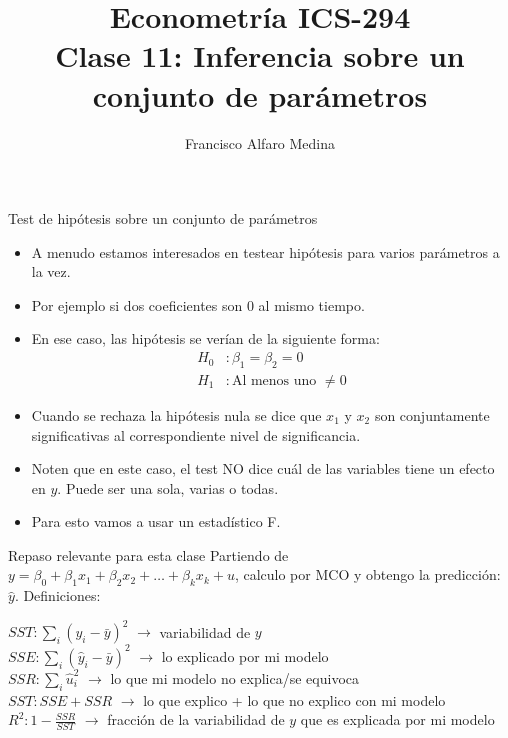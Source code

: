 \documentclass{beamer}
\title[ICS-162]{Econometría ICS-294\\ \small{Clase 11: Inferencia sobre un conjunto de parámetros}}
\author{Francisco Alfaro Medina}
\institute[USM]
{Universidad Técnica Federico Santa María\\ %
	\medskip
	\textit{} %
	
}
\date{}
\begin{document}
	
\begin{frame}
	\titlepage %


\end{frame}

\begin{frame}[shrink=10]{Test de hipótesis sobre un conjunto de parámetros}
    \begin{itemize}
        \item A menudo estamos interesados en testear hipótesis para varios parámetros a la vez.
        
        \item Por ejemplo si dos coeficientes son 0 al mismo tiempo.
        \item En ese caso, las hipótesis se verían de la siguiente forma:
        \begin{align*}
            H_0 & : \beta_{\text{1}} = \beta_{\text{2}} = 0 \\
            H_1 & :  \text{Al menos uno }\neq 0
        \end{align*}
        \item Cuando se rechaza la hipótesis nula se dice que $x_1$ y $x_2$ son conjuntamente significativas al correspondiente nivel de significancia.
        \item Noten que en este caso, el test NO dice cuál de las variables tiene un efecto en \( y \). Puede ser una sola, varias o todas.
        \item Para esto vamos a usar un estadístico F.
    \end{itemize}
\end{frame}

\begin{frame}{Repaso relevante para esta clase}
    Partiendo de \( y = \beta_0 + \beta_1 x_1 + \beta_2 x_2 + \ldots + \beta_k x_k + u \), calculo por MCO y obtengo la predicción: \( \hat{y} \). Definiciones:
    \begin{center}
        \( SST : \sum_i (y_i - \bar{y})^2 \) $\rightarrow$ variabilidad de \( y \)\\
        \( SSE : \sum_i (\hat{y}_i - \bar{y})^2 \) $\rightarrow$ lo explicado por mi modelo\\
        \( SSR : \sum_i \hat{u}_i^2 \) $\rightarrow$ lo que mi modelo no explica/se equivoca\\
        \( SST : SSE + SSR \) $\rightarrow$ lo que explico + lo que no explico con mi modelo\\
        \( R^2 : 1 - \frac{SSR}{SST} \) $\rightarrow$   fracción de la  variabilidad de \( y \) que es explicada por mi modelo
    \end{center}
\end{frame}
\end{document}
